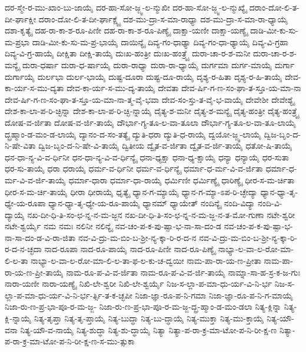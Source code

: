 {ದರ-ಸ್ಮೇ-ರ-ಮು-ಖಾಂ-ಬು-ಜಾಯೈ
ದರ-ಹಾ-ಸೋ-ಜ್ಜ್ವ-ಲ-ನ್ಮುಖೀ
ದರ-ಹಾ-ಸೋ-ಜ್ಜ್ವ-ಲ-ನ್ಮುಖ್ಯೈ
ದರಾಂ-ದೋ-ಲಿ-ತ-ದೀ-ರ್ಘಾಕ್ಷೀ
ದರಾಂ-ದೋ-ಲಿ-ತ-ದೀ-ರ್ಘಾಕ್ಷ್ಯೈ
ದಶ-ಮು-ದ್ರಾ-ಸ-ಮಾ-ರಾಧ್ಯಾ
ದಶ-ಮು-ದ್ರಾ-ಸ-ಮಾ-ರಾ-ಧ್ಯಾಯೈ
ದಶಾ-ಕೃತ್ಯೈ
ದಹ-ರಾ-ಕಾ-ಶ-ರೂ-ಪಿಣೀ
ದಹ-ರಾ-ಕಾ-ಶ-ರೂ-ಪಿಣ್ಯೈ
ದಾಕ್ಷಾ-ಯಣೀ
ದಾಕ್ಷಾ-ಯಣ್ಯೈ
ದಾಡಿ-ಮೀ-ಕು-ಸು-ಮ-ಪ್ರಭಾ
ದಾಡಿ-ಮೀ-ಕು-ಸು-ಮ-ಪ್ರ-ಭಾಯೈ
ದಾಯಿನ್ಯೈ
ದಿವ್ಯ-ಗಂ-ಧಾಢ್ಯಾ
ದಿವ್ಯ-ಗಂ-ಧಾ-ಢ್ಯಾಯೈ
ದಿವ್ಯ-ವಿ-ಗ್ರಹಾ
ದಿವ್ಯ-ವಿ-ಗ್ರ-ಹಾಯೈ
ದೀಕ್ಷಿತಾ
ದೀಕ್ಷಿ-ತಾಯೈ
ದುಃಖ-ಹಂತ್ರೀ
ದುಃಖ-ಹಂತ್ರ್ಯೈ
ದುರಾ-ಚಾ-ರ-ಶ-ಮನೀ
ದುರಾ-ಚಾ-ರ-ಶ-ಮನ್ಯೈ
ದುರಾ-ಧರ್ಷಾ
ದುರಾ-ಧ-ರ್ಷಾಯೈ
ದುರಾ-ರಾಧ್ಯಾ
ದುರಾ-ರಾ-ಧ್ಯಾಯೈ
ದುರ್ಗಮಾ
ದುರ್ಗ-ಮಾಯೈ
ದುರ್ಗಾ
ದುರ್ಗಾಯೈ
ದುರ್ಲಭಾ
ದುರ್ಲ-ಭಾಯೈ
ದುಷ್ಟ-ದೂರಾ
ದುಷ್ಟ-ದೂ-ರಾಯೈ
ದೃಶ್ಯ-ರ-ಹಿತಾ
ದೃಶ್ಯ-ರ-ಹಿ-ತಾಯೈ
ದೇವ-ಕಾ-ರ್ಯ-ಸ-ಮು-ದ್ಯತಾ
ದೇವ-ಕಾ-ರ್ಯ-ಸ-ಮು-ದ್ಯ-ತಾಯೈ
ದೇವತಾ
ದೇವ-ರ್ಷಿ-ಗ-ಣ-ಸಂ-ಘಾ-ತ-ಸ್ತೂ-ಯ-ಮಾ-ನಾ
ದೇವ-ರ್ಷಿ-ಗ-ಣ-ಸಂ-ಘಾ-ತ-ಸ್ತೂ-ಯ-ಮಾ-ನಾ-ತ್ಮ-ವೈ-ಭವಾ
ದೇವ-ಸಂ-ಸ್ತು-ತ-ವೈ-ಭ-ವಾಯೈ
ದೇವೇಶೀ
ದೇವೇಶ್ಯೈ
ದೇಶ-ಕಾ-ಲಾ-ಪ-ರಿ-ಚ್ಛಿನ್ನಾ
ದೇಶ-ಕಾ-ಲಾ-ಪ-ರಿ-ಚ್ಛಿ-ನ್ನಾಯೈ
ದೈತ್ಯ-ಶ-ಮನೀ
ದೈತ್ಯ-ಶ-ಮನ್ಯೈ
ದೈತ್ಯ-ಹಂತ್ರೀ
ದೈತ್ಯ-ಹಂತ್ರ್ಯೈ
ದೋಷ-ವ-ರ್ಜಿತಾ
ದೋಷ-ವ-ರ್ಜಿ-ತಾಯೈ
ದೌರ್ಭಾ-ಗ್ಯ-ತೂ-ಲ-ವಾ-ತೂಲಾ
ದೌರ್ಭಾ-ಗ್ಯ-ತೂ-ಲ-ವಾ-ತೂ-ಲಾಯೈ
ದ್ಬ್ರಹ್ಮಾಂ-ಡ-ಮಂ-ಡ-ಲಾಯೈ
ದ್ಯಾನಂ-ದ-ಸಂ-ತತ್ಯೈ
ದ್ಯುತಿ-ಧರಾ
ದ್ಯುತಿ-ಧ-ರಾಯೈ
ದ್ವಯೋ-ಜ್ಜ್ವ-ಲಾಯೈ
ದ್ವಿಜ-ಬೃಂ-ದ-ನಿ-ಷೇ-ವಿತಾ
ದ್ವಿಜ-ಬೃಂ-ದ-ನಿ-ಷೇ-ವಿ-ತಾಯೈ
ದ್ವಿತೀಯ
ದ್ವೈತ-ವ-ರ್ಜಿತಾ
ದ್ವೈತ-ವ-ರ್ಜಿ-ತಾಯೈ
ಧತೋ-ಷಿ-ತಾಯೈ
ಧನ-ಧಾ-ನ್ಯ-ವಿ-ವ-ರ್ಧಿನೀ
ಧನ-ಧಾ-ನ್ಯ-ವಿ-ವ-ರ್ಧಿನ್ಯೈ
ಧನಾ-ಧ್ಯಕ್ಷಾ
ಧನಾ-ಧ್ಯ-ಕ್ಷಾಯೈ
ಧನ್ಯಾ
ಧನ್ಯಾಯೈ
ಧರ-ಸುತಾ
ಧರ-ಸು-ತಾಯೈ
ಧರಾ
ಧರಾಯೈ
ಧರ್ಮ-ವ-ರ್ಧಿನೀ
ಧರ್ಮ-ವ-ರ್ಧಿನ್ಯೈ
ಧರ್ಮಾ-ಧ-ರ್ಮ-ವಿ-ವ-ರ್ಜಿತಾ
ಧರ್ಮಾ-ಧ-ರ್ಮ-ವಿ-ವ-ರ್ಜಿ-ತಾಯೈ
ಧರ್ಮಾ-ಧಾರಾ
ಧರ್ಮಾ-ಧಾ-ರಾಯೈ
ಧರ್ಮಿಣೀ
ಧರ್ಮಿಣ್ಯೈ
ಧಾರಿಣ್ಯೈ
ಧೀರ-ಸ-ಮ-ರ್ಚಿತಾ
ಧೀರ-ಸ-ಮ-ರ್ಚಿ-ತಾಯೈ
ಧೀರಾ
ಧೀರಾಯೈ
ಧೃತ್ಯೈ
ಧ್ಯಾನ-ಗ-ಮ್ಯಾಯೈ
ಧ್ಯಾನ-ಗ-ಮ್ಯಾ-ಽಪ-ರಿ-ಚ್ಛೇದ್ಯಾ
ಧ್ಯಾನ-ಧ್ಯಾ-ತೃ-ಧ್ಯೇ-ಯ-ರೂಪಾ
ಧ್ಯಾನ-ಧ್ಯಾ-ತೃ-ಧ್ಯೇ-ಯ-ರೂ-ಪಾಯೈ
ಧ್ಯಾನಮ್
ಧ್ಯಾಯೇತ್
ನಂದಿನ್ಯೈ
ನಂದಿ-ವಿದ್ಯಾ
ನಂದಿ-ವಿ-ದ್ಯಾಯೈ
ನಖ-ದೀ-ಧಿ-ತಿ-ಸಂ-ಛ-ನ್ನ-ನ-ಮ-ಜ್ಜನ
ನಖ-ದೀ-ಧಿ-ತಿ-ಸಂ-ಛ-ನ್ನ-ನ-ಮ-ಜ್ಜ-ನ-ತ-ಮೋ-ಗುಣಾ
ನಟೇ-ಶ್ವರೀ
ನಟೇ-ಶ್ವರ್ಯೈ
ನಮ
ನಮಃ
ನಲಿನೀ
ನಲಿನ್ಯೈ
ನವ-ಚಂ-ಪ-ಕ-ಪು-ಷ್ಪಾ-ಭ-ನಾ-ಸಾ-ದಂ-ಡ
ನವ-ಚಂ-ಪ-ಕ-ಪು-ಷ್ಪಾ-ಭ-ನಾ-ಸಾ-ದಂ-ಡ-ವಿ-ರಾ-ಜಿತಾ
ನವ-ವಿ-ದ್ರು-ಮ-ಬಿಂ-ಬ-ಶ್ರೀ-ನ್ಯ-ಕ್ಕಾ-ರಿ-ರ-ದ-ನ
ನವ-ವಿ-ದ್ರು-ಮ-ಬಿಂ-ಬ-ಶ್ರೀ-ನ್ಯ-ಕ್ಕಾ-ರಿ-ರ-ದ-ನ-ಚ್ಛದಾ
ನಾದ-ರೂಪಾ
ನಾದ-ರೂ-ಪಾಯೈ
ನಾದ-ರೂ-ಪಿಣೀ
ನಾದ-ರೂ-ಪಿಣ್ಯೈ
ನಾಭ್ಯಾ-ಲ-ವಾ-ಲ-ರೋ-ಮಾ-ಲಿ-ಲ-ತಾ
ನಾಭ್ಯಾ-ಲ-ವಾ-ಲ-ರೋ-ಮಾ-ಲಿ-ಲ-ತಾ-ಫ-ಲ-ಕು-ಚ-ದ್ವಯೀ
ನಾಮ-ಪಾ-ರಾ-ಯ-ಣ-ಪ್ರೀತಾ
ನಾಮ-ಪಾ-ರಾ-ಯ-ಣ-ಪ್ರೀ-ತಾಯೈ
ನಾಮ-ರೂ-ಪ-ವಿ-ವ-ರ್ಜಿತಾ
ನಾಮ-ರೂ-ಪ-ವಿ-ವ-ರ್ಜಿ-ತಾಯೈ
ನಾಮ್ನಾ-ಸಾ-ಹ-ಸ್ರ-ಕ-ಜ-ಗುಃ
ನಾರಾ-ಯಣೀ
ನಾರಾ-ಯಣ್ಯೈ
ನಿಖಿ-ಲೇ-ಶ್ವರೀ
ನಿಖಿ-ಲೇ-ಶ್ವರ್ಯೈ
ನಿಜ-ಸ-ಲ್ಲಾ-ಪ-ಮಾ-ಧು-ರ್ಯ-ವಿ-ನಿ-ರ್ಭ
ನಿಜ-ಸ-ಲ್ಲಾ-ಪ-ಮಾ-ಧು-ರ್ಯ-ವಿ-ನಿ-ರ್ಭ-ರ್ತ್ಸಿ-ತ-ಕ-ಚ್ಛಪೀ
ನಿಜಾ-ಜ್ಞಾ-ರೂ-ಪ-ನಿ-ಗಮಾ
ನಿಜಾ-ಜ್ಞಾ-ರೂ-ಪ-ನಿ-ಗ-ಮಾಯೈ
ನಿಜಾ-ರು-ಣ-ಪ್ರ-ಭಾ-ಪೂ-ರ-ಮ-ಜ್ಜ-
ನಿಜಾ-ರು-ಣ-ಪ್ರ-ಭಾ-ಪೂ-ರ-ಮ-ಜ್ಜ-ದ್ಬ್ರ-ಹ್ಮಾಂ-ಡ-ಮಂ-ಡಲಾ
ನಿತ್ಯ-ಕ್ಲಿನ್ನಾ
ನಿತ್ಯ-ಕ್ಲಿ-ನ್ನಾಯೈ
ನಿತ್ಯ-ತೃಪ್ತಾ
ನಿತ್ಯ-ತೃ-ಪ್ತಾಯೈ
ನಿತ್ಯ-ಬುದ್ಧಾ
ನಿತ್ಯ-ಬು-ದ್ಧಾಯೈ
ನಿತ್ಯ-ಮುಕ್ತಾ
ನಿತ್ಯ-ಮು-ಕ್ತಾಯೈ
ನಿತ್ಯ-ಯೌ-ವನಾ
ನಿತ್ಯ-ಯೌ-ವ-ನಾಯೈ
ನಿತ್ಯ-ಶುದ್ಧಾ
ನಿತ್ಯ-ಶು-ದ್ಧಾಯೈ
ನಿತ್ಯಾ
ನಿತ್ಯಾ-ಪ-ರಾ-ಕ್ರ-ಮಾ-ಟೋ-ಪ-ನಿ-ರೀ-ಕ್ಷ-ಣ
ನಿತ್ಯಾ-ಪ-ರಾ-ಕ್ರ-ಮಾ-ಟೋ-ಪ-ನಿ-ರೀ-ಕ್ಷ-ಣ-ಸ-ಮು-ತ್ಸುಕಾ
}
